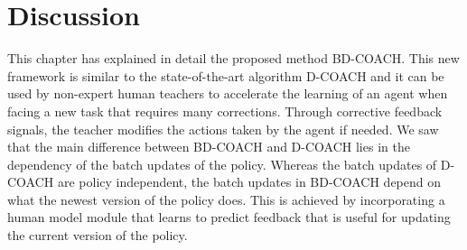 \section{Discussion}
\label{section:Algorithm-Discussion}
This chapter has explained in detail the proposed method BD-COACH. This new framework is similar to the state-of-the-art algorithm D-COACH and it can be used by non-expert human teachers to accelerate the learning of an agent when facing a new task that requires many corrections. Through corrective feedback signals, the teacher modifies the actions taken by the agent if needed. We saw that the main difference between BD-COACH and D-COACH lies in the dependency of the batch updates of the policy. Whereas the batch updates of D-COACH are policy independent, the batch updates in BD-COACH depend on what the newest version of the policy does. This is achieved by incorporating a human model module that learns to predict feedback that is useful for updating the current version of the policy.




